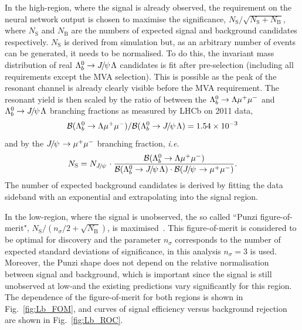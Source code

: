 In the high-\qsq region, where the signal is already observed, the requirement on the neural network output
is chosen to maximise the significance, $N_{\mathrm{S}}/\sqrt{N_{\mathrm{S}}+N_{\mathrm{B}}}$, where
$N_\mathrm{S}$ and $N_\mathrm{B}$ are the numbers of expected signal and background candidates respectively.
$N_\mathrm{S}$ is derived from simulation but, as an arbitrary number of events can be generated, it
needs to be normalised. To do this, the invariant mass distribution of real $\Lb\to\jpsi\Lz$ candidates
is fit after pre-selection (including all requirements except the MVA selection). This is possible as the peak of the resonant
channel is already clearly visible before the MVA requirement. The resonant yield is then scaled by the ratio
of between the ${{\Lambda}^0_{b}}\rightarrow{\ensuremath{\Lambda}}{\ensuremath{\mu^+\mu^-}}$ and $\Lb\to\jpsi\Lz$ branching fractions as measured 
by LHCb on 2011 data, 
\begin{equation}
\BR(\Lb\to\Lz\mumu) / \BR(\Lb\to\jpsi\Lz) =  1.54 \times 10^{-3}
\end{equation}
\noindent
and by the $\jpsi\to\mumu$ branching fraction, \emph{i.e.}
\begin{equation}
N_\mathrm{S} = N_\jpsi \cdot \frac{\BR(\Lb\to\Lz\mumu)}{\BR(\Lb\to\jpsi\Lz) \cdot \BR(\jpsi\to\mumu) }.
\end{equation}
%
The number of expected background candidates is derived by fitting the data
sideband with an exponential and extrapolating into the signal region.

In the low-\qsq region, where the signal is unobserved, the so called ``Punzi figure-of-merit",
$N_{\mathrm{S}}/(n_\sigma/2+\sqrt{N_{\mathrm{B}}})$, is maximised~\cite{Punzi:2003bu}.
This figure-of-merit is considered to be optimal for discovery and the parameter $n_\sigma$ corresponds to
the number of expected standard deviations of significance, in this analysis $n_\sigma = 3$ is used.
Moreover, the Punzi shape does not depend on the relative normalisation between signal and background, which
is important since the signal is still unobserved at low-\qsq and the existing predictions vary significantly
for this region. The dependence of the figure-of-merit for both \qsq regions is shown in Fig.~\ref{fig:Lb_FOM}, and curves
of signal efficiency versus background rejection are shown in Fig.~\ref{fig:Lb_ROC}.

